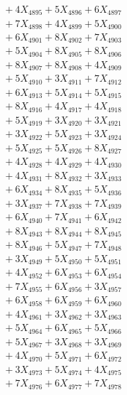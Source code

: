 \documentclass[a4paper,10pt]{article}
\begin{document}
{\begin{align}
&\;  + 4 X_{4895} + 5 X_{4896} + 6 X_{4897} \\[0.3ex]
&\;  + 7 X_{4898} + 4 X_{4899} + 5 X_{4900} \\[0.5ex]\allowbreak
&\;  + 6 X_{4901} + 8 X_{4902} + 7 X_{4903} \\[0.3ex]
&\;  + 5 X_{4904} + 8 X_{4905} + 8 X_{4906} \\[0.3ex]
&\;  + 8 X_{4907} + 8 X_{4908} + 4 X_{4909} \\[0.3ex]
&\;  + 5 X_{4910} + 3 X_{4911} + 7 X_{4912} \\[0.3ex]
&\;  + 6 X_{4913} + 5 X_{4914} + 5 X_{4915} \\[0.3ex]
&\;  + 8 X_{4916} + 4 X_{4917} + 4 X_{4918} \\[0.3ex]
&\;  + 5 X_{4919} + 3 X_{4920} + 3 X_{4921} \\[0.3ex]
&\;  + 3 X_{4922} + 5 X_{4923} + 3 X_{4924} \\[0.3ex]
&\;  + 5 X_{4925} + 5 X_{4926} + 8 X_{4927} \\[0.3ex]
&\;  + 4 X_{4928} + 4 X_{4929} + 4 X_{4930} \\[0.5ex]\allowbreak
&\;  + 4 X_{4931} + 8 X_{4932} + 3 X_{4933} \\[0.3ex]
&\;  + 6 X_{4934} + 8 X_{4935} + 5 X_{4936} \\[0.3ex]
&\;  + 3 X_{4937} + 7 X_{4938} + 7 X_{4939} \\[0.3ex]
&\;  + 6 X_{4940} + 7 X_{4941} + 6 X_{4942} \\[0.3ex]
&\;  + 8 X_{4943} + 8 X_{4944} + 8 X_{4945} \\[0.3ex]
&\;  + 8 X_{4946} + 5 X_{4947} + 7 X_{4948} \\[0.3ex]
&\;  + 3 X_{4949} + 5 X_{4950} + 5 X_{4951} \\[0.3ex]
&\;  + 4 X_{4952} + 6 X_{4953} + 6 X_{4954} \\[0.3ex]
&\;  + 7 X_{4955} + 6 X_{4956} + 3 X_{4957} \\[0.3ex]
&\;  + 6 X_{4958} + 6 X_{4959} + 6 X_{4960} \\[0.5ex]\allowbreak
&\;  + 4 X_{4961} + 3 X_{4962} + 3 X_{4963} \\[0.3ex]
&\;  + 5 X_{4964} + 6 X_{4965} + 5 X_{4966} \\[0.3ex]
&\;  + 5 X_{4967} + 3 X_{4968} + 3 X_{4969} \\[0.3ex]
&\;  + 4 X_{4970} + 5 X_{4971} + 6 X_{4972} \\[0.3ex]
&\;  + 3 X_{4973} + 5 X_{4974} + 4 X_{4975} \\[0.3ex]
&\;  + 7 X_{4976} + 6 X_{4977} + 7 X_{4978} \\[0.3ex]

\end{align}}
\end{document}
